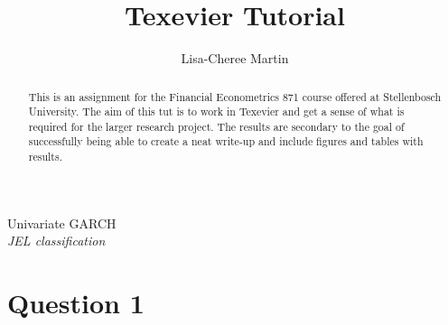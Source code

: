 \documentclass[11pt,preprint, authoryear]{elsarticle}
\numberwithin{equation}{section}
\numberwithin{figure}{section}
\numberwithin{table}{section}
\begin{document}
\begin{frontmatter}  %

\title{Texevier Tutorial}





\author[Add1]{Lisa-Cheree Martin}





\address[Add1]{Stellenbosch University, Stellenbosch, South Africa}


\begin{abstract}
\small{
This is an assignment for the Financial Econometrics 871 course offered
at Stellenbosch University. The aim of this tut is to work in Texevier
and get a sense of what is required for the larger research project. The
results are secondary to the goal of successfully being able to create a
neat write-up and include figures and tables with results.
}
\end{abstract}

\vspace{1cm}

\begin{keyword}
\footnotesize{
Univariate GARCH \\ \vspace{0.3cm}
\textit{JEL classification} 
}
\end{keyword}
\vspace{0.5cm}
\end{frontmatter}



\pagestyle{fancy}
\chead{}
\lfoot{}
\lhead{}
\cfoot{}


\headsep 35pt %




\section{\texorpdfstring{Question 1
\label{Q1}}{Question 1 }}\label{question-1}
\end{document}
